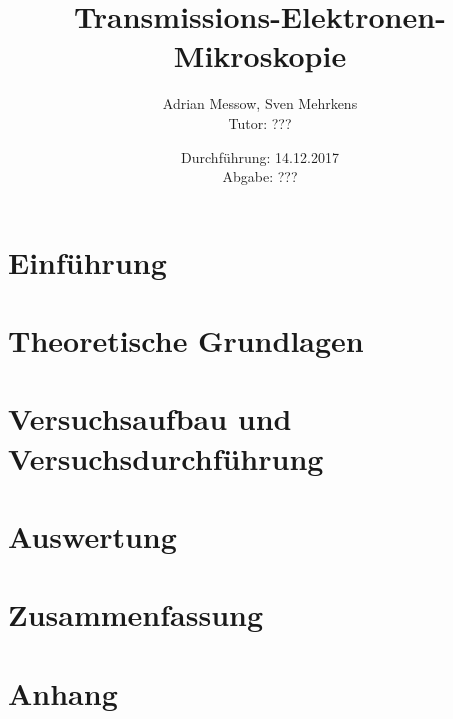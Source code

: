 \documentclass[a4paper,11pt,DIV=11]{scrartcl}
\title{Transmissions-Elektronen-Mikroskopie}
\author{Adrian Messow, Sven Mehrkens \\
Tutor: ???}
\date{Durchführung: 14.12.2017 \\ Abgabe: ??? }
\begin{document}
\maketitle
\section{Einführung}

\section{Theoretische Grundlagen}
	
\section{Versuchsaufbau und Versuchsdurchführung}

\section{Auswertung}

\section{Zusammenfassung}

\section*{Anhang}
\end{document}

